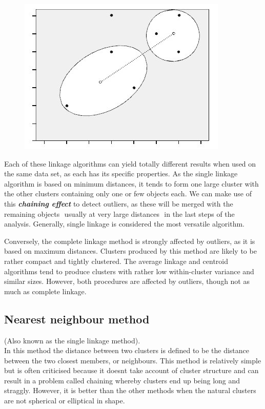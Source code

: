 \documentclass[a4paper,12pt]{report}
\begin{document}
\begin{itemize}
\begin{description}
\begin{figure}[h!]
\begin{center}
				\includegraphics[scale=0.4]{images/Link4.jpg}\\
			\end{center}
		\end{figure}
	\end{description}
	Each of these linkage algorithms can yield totally different results when used on the same data set, as each has its specific properties. As the single linkage algorithm is based on minimum distances, it tends to form one large cluster with the other clusters containing only one or few objects each. We can make use of this \textbf{\textit{chaining effect}} to detect outliers, as these will be merged with the remaining objects  usually at very large distances  in the last steps of the analysis. Generally, single linkage is considered the most versatile algorithm.
	
	Conversely, the complete linkage method is strongly affected by outliers, as it is based on maximum distances. Clusters produced by this method are likely to be rather compact and tightly clustered. The average linkage and centroid algorithms tend to produce clusters with rather low within-cluster variance and similar sizes.
	However, both procedures are affected by outliers, though not as much as complete linkage.
\end{itemize}

\subsection{Nearest neighbour method} 
(Also known as the single linkage method).\\
In this method the distance between two clusters is defined to be the distance between
the two closest members, or neighbours. This method is relatively simple but is often
criticised because it doesnt take account of cluster structure and can result in a problem
called chaining whereby clusters end up being long and straggly. However, it is better
than the other methods when the natural clusters are not spherical or elliptical in shape.
\end{document}
